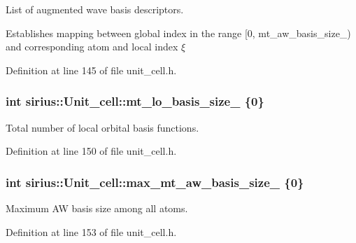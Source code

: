 List of augmented wave basis descriptors. 

Establishes mapping between global index in the range \mbox{[}0, mt\+\_\+aw\+\_\+basis\+\_\+size\+\_\+) and corresponding atom and local index $ \xi $ 

Definition at line 145 of file unit\+\_\+cell.\+h.

\hypertarget{classsirius_1_1_unit__cell_a64b9370ff27b0fdf91a035e61f025456}{}
\subsubsection[{mt\+\_\+lo\+\_\+basis\+\_\+size\+\_\+}]{\setlength{\rightskip}{0pt plus 5cm}int sirius\+::\+Unit\+\_\+cell\+::mt\+\_\+lo\+\_\+basis\+\_\+size\+\_\+ \{0\}\hspace{0.3cm}{\ttfamily [private]}}\label{classsirius_1_1_unit__cell_a64b9370ff27b0fdf91a035e61f025456}


Total number of local orbital basis functions. 



Definition at line 150 of file unit\+\_\+cell.\+h.

\hypertarget{classsirius_1_1_unit__cell_adfdf46843e5d5cb6eeb94b4e681f75ed}{}
\subsubsection[{max\+\_\+mt\+\_\+aw\+\_\+basis\+\_\+size\+\_\+}]{\setlength{\rightskip}{0pt plus 5cm}int sirius\+::\+Unit\+\_\+cell\+::max\+\_\+mt\+\_\+aw\+\_\+basis\+\_\+size\+\_\+ \{0\}\hspace{0.3cm}{\ttfamily [private]}}\label{classsirius_1_1_unit__cell_adfdf46843e5d5cb6eeb94b4e681f75ed}


Maximum A\+W basis size among all atoms. 



Definition at line 153 of file unit\+\_\+cell.\+h.

